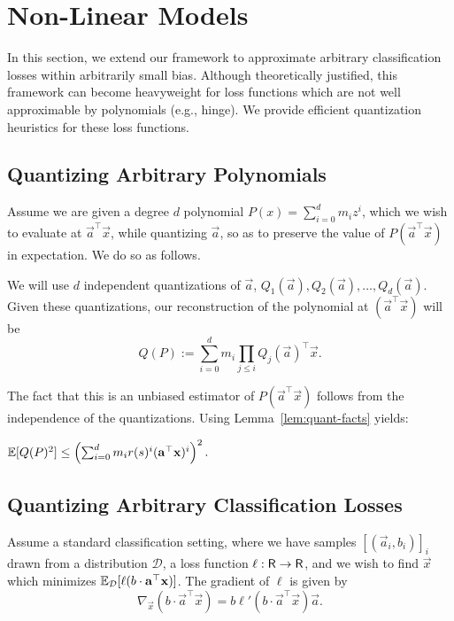 \section{Non-Linear Models}

In this section, we extend our framework to approximate arbitrary classification losses within arbitrarily small bias. 
Although theoretically justified, this framework can become heavyweight for loss functions which are not well approximable by polynomials 
(e.g., hinge). We provide efficient quantization heuristics for these loss functions. 

\subsection{Quantizing Arbitrary Polynomials} 

Assume we are given a degree $d$ polynomial $P(x) = \sum_{i = 0}^{d} m_i z^i$, which
we wish to evaluate at $\vec{a}^\top \vec{x}$, while quantizing $\vec{a}$, so as to preserve the value of $P( \vec{a}^\top \vec{x})$ in expectation. 
We do so as follows. 

We will use $d$ independent quantizations of $\vec{a}$, $Q_1(\vec{a}), Q_2(\vec{a}), \ldots, Q_d(\vec{a})$. 
Given these quantizations, our reconstruction of the polynomial at $( \vec{a}^\top \vec{x})$ will be 
$$ Q(P) := \sum_{i = 0}^d m_i \prod_{j \leq i} Q_j(\vec{a})^\top \vec{x}.$$

The fact that this is an unbiased estimator of $P( \vec{a}^\top \vec{x} )$ follows from the independence of the quantizations. Using Lemma~\ref{lem:quant-facts} yields:

\begin{lemma}
\label{lem:poly-sec-moment-bound}
	$\mathbb{E}[ Q(P)^2 ] \leq \left(\sum_{i = 0}^d m_i r(s)^i (\mathbf{a}^\top \mathbf{x})^i\right)^2.$
\end{lemma} 








\subsection{Quantizing Arbitrary Classification Losses}

Assume a standard classification setting, where we have samples $[(\vec{a}_i, b_i)]_i$ drawn from a distribution $\mathcal{D}$, a loss function $\ell: \mathsf{R} \rightarrow \mathsf{R}$, and we wish to find $\vec{x}$ which minimizes $\mathbb{E}_{\mathcal{D}} [ \ell( b \cdot \mathbf{a}^\top \mathbf{x}) ]$. The gradient of $\ell$ is given by 
$$ \nabla_\vec{x} (b \cdot \vec{a}^\top \vec{x}) = b \ell' (b \cdot \vec{a}^\top \vec{x}) \vec{a}.$$

